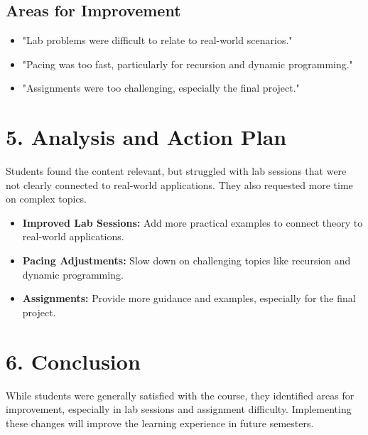 \documentclass{article}
\begin{document}
\subsection*{Areas for Improvement}
\begin{itemize}
    \item "Lab problems were difficult to relate to real-world scenarios."
    \item "Pacing was too fast, particularly for recursion and dynamic programming."
    \item "Assignments were too challenging, especially the final project."
\end{itemize}

\section*{5. Analysis and Action Plan}
Students found the content relevant, but struggled with lab sessions that were not clearly connected to real-world applications. They also requested more time on complex topics.

\begin{itemize}
    \item \textbf{Improved Lab Sessions:} Add more practical examples to connect theory to real-world applications.
    \item \textbf{Pacing Adjustments:} Slow down on challenging topics like recursion and dynamic programming.
    \item \textbf{Assignments:} Provide more guidance and examples, especially for the final project.
\end{itemize}

\section*{6. Conclusion}
While students were generally satisfied with the course, they identified areas for improvement, especially in lab sessions and assignment difficulty. Implementing these changes will improve the learning experience in future semesters.
\end{document}
